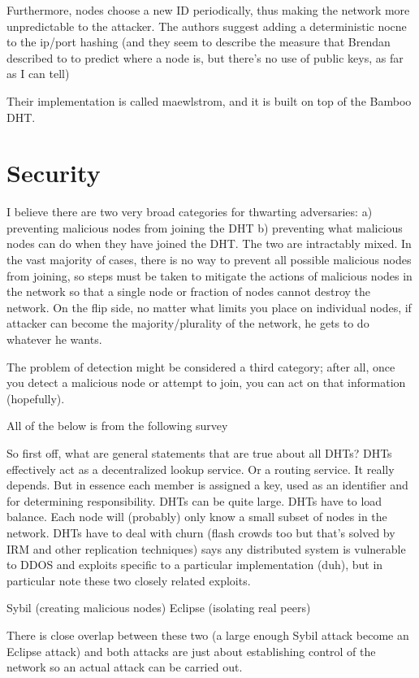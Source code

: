\documentclass[10pt,letterpaper]{report}
\begin{document}
Furthermore, nodes choose a new ID periodically, thus making the network more unpredictable to the attacker.   The authors suggest adding a deterministic nocne to the ip/port hashing (and they seem to describe the measure that Brendan described to to predict where a node is, but there's no use of public keys, as far as I can tell)

Their implementation is called maewlstrom, and it is built on top of the Bamboo DHT.


\section{Security}

I believe there are two very broad categories for thwarting adversaries:  a)  preventing malicious nodes from joining the DHT b) preventing what malicious nodes can do when they have joined the DHT.  The two are intractably mixed.  In the vast majority of cases, there is no way to prevent all possible malicious nodes from joining, so steps must be taken to mitigate the actions of malicious nodes in the network so that a single node or fraction of nodes cannot destroy the network.  On the flip side, no matter what limits you place on individual nodes, if attacker can become the majority/plurality of the network, he gets to do whatever he wants.

The problem of detection might be considered a third category;  after all, once you detect a malicious node or attempt to join, you can act on that information (hopefully).

All of the below is from the following survey \cite{dhtsec}


So first off, what are general statements that are true about all DHTs?
DHTs  effectively act as a decentralized lookup service.  Or a routing service.  It really depends.  But in essence each member is assigned a key, used as an identifier and for determining responsibility.
DHTs can be quite large.
DHTs have to load balance.
Each node will (probably) only know a small subset of nodes in the network.
DHTs have to deal with churn (flash crowds too but that's solved by IRM and other replication techniques)
\cite{dhtsec} says any distributed system is vulnerable to DDOS and exploits specific to a particular implementation (duh), but in particular note these two closely related exploits. 

Sybil (creating malicious nodes)
Eclipse (isolating real peers)

There is close overlap between these two (a large enough Sybil attack become an Eclipse attack) and both attacks are just about establishing control of the network so an actual attack can be carried out.
\end{document}
